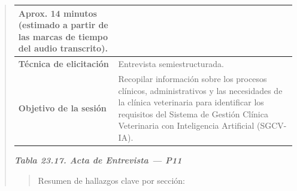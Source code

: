 \documentclass[
]{article}
\begin{document}
\begin{quote}
{\begin{longtable}[]{|
  >{\raggedright\arraybackslash}p{}|
  >{\raggedright\arraybackslash}p{}|}
\begin{minipage}[t]{\linewidth}
Aprox. 14 minutos (estimado a partir de las marcas de tiempo del audio transcrito).
\end{minipage} \\
\hline
\textbf{Técnica de elicitación} & \begin{minipage}[t]{\linewidth}\raggedright
Entrevista semiestructurada.
\end{minipage} \\
\hline
\textbf{Objetivo de la sesión} & \begin{minipage}[t]{\linewidth}\raggedright
Recopilar información sobre los procesos clínicos, administrativos y las necesidades de la clínica veterinaria para identificar los requisitos del Sistema de Gestión Clínica Veterinaria con Inteligencia Artificial (SGCV-IA).
\end{minipage} \\
\hline
\end{longtable}
}

\protect{}\label{_bookmark_P11_acta}{}\emph{\textbf{Tabla 23.17. Acta de Entrevista --- P11}}

\begin{quote}
Resumen de hallazgos clave por sección:
\end{quote}


\end{quote}
\end{document}
